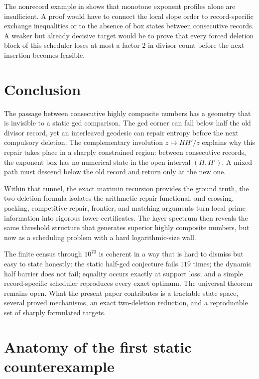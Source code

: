 \documentclass[11pt]{article}
\numberwithin{equation}{section}
\theoremstyle{blueplain}
\theoremstyle{bluedef}
\begin{document}
The nonrecord example in  shows that monotone exponent profiles alone are insufficient.  A proof would have to connect the local slope order to record-specific exchange inequalities or to the absence of box states between consecutive records.  A weaker but already decisive target would be to prove that every forced deletion block of this scheduler loses at most a factor $2$ in divisor count before the next insertion becomes feasible.

\section{Conclusion}
\label{sec:conclusion}

The passage between consecutive highly composite numbers has a geometry that is invisible to a static gcd comparison.  The gcd corner can fall below half the old divisor record, yet an interleaved geodesic can repair entropy before the next compulsory deletion.  The complementary involution $z\mapsto HH'/z$ explains why this repair takes place in a sharply constrained region: between consecutive records, the exponent box has no numerical state in the open interval $(H,H')$.  A mixed path must descend below the old record and return only at the new one.

Within that tunnel, the exact maximin recursion provides the ground truth, the two-deletion formula isolates the arithmetic repair functional, and crossing, packing, competitive-repair, frontier, and matching arguments turn local prime information into rigorous lower certificates.  The layer spectrum then reveals the same threshold structure that generates superior highly composite numbers, but now as a scheduling problem with a hard logarithmic-size wall.

The finite census through $10^{70}$ is coherent in a way that is hard to dismiss but easy to state honestly: the static half-gcd conjecture fails $119$ times; the dynamic half barrier does not fail; equality occurs exactly at support loss; and a simple record-specific scheduler reproduces every exact optimum.  The universal theorem remains open.  What the present paper contributes is a tractable state space, several proved mechanisms, an exact two-deletion reduction, and a reproducible set of sharply formulated targets.

\appendix

\section{Anatomy of the first static counterexample}
\label{app:first-counterexample}
\end{document}
